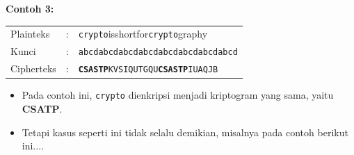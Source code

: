 \documentclass{article}
\begin{document}

\textbf{Contoh 3:}

\begin{tabular}{lll}
Plainteks & : & \texttt{\color{red}crypto}isshortfor\texttt{\color{red}crypto}graphy} \\
Kunci & : & \texttt{abcdabcdabcdabcdabcdabcdabcdabcd} \\
Cipherteks & : & \texttt{\textbf{CSASTP}KVSIQUTGQU\textbf{CSASTP}IUAQJB} \\
\end{tabular}

\vspace{10mm}

\begin{itemize}
    \item Pada contoh ini, \texttt{crypto} dienkripsi menjadi kriptogram yang sama, yaitu \textbf{CSATP}.
    \item Tetapi kasus seperti ini tidak selalu demikian, misalnya pada contoh berikut ini....
\end{itemize}
\end{document}
